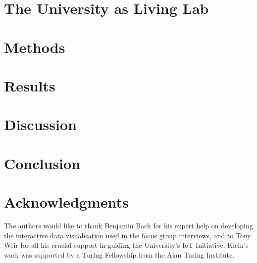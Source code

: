 \documentclass[10pt,twocolumn]{article}
\begin{document}
\section{The University as Living Lab}
\label{sec:university-as-ll}



\section{Methods}
\label{sec:methods}




\section{Results}
\label{sec:results}



\section{Discussion}
\label{sec:discussion}





\section{Conclusion}

\label{sec:conclusion}




\section*{Acknowledgments}


The authors would like to thank Benjamin Bach for his expert help on
developing the interactive data visualisation used in the focus group
interviews, and to Tony Weir for all his crucial support in guiding the University's IoT
Initiative. Klein's work was supported by a Turing Fellowship from the
Alan Turing Institute.


\printbibliography 

\end{document}
